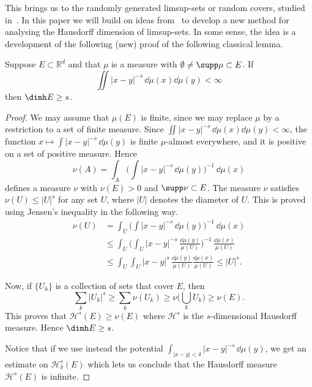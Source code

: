 This brings us to the randomly generated limsup-sets or random covers, studied in~\cite{fanwu,durand,jarvenpaaetal,persson,fengetal,seuret,ekstrompersson}. In this paper we will build on ideas from~\cite{persson} to develop a new method for analysing the Hausdorff dimension of limsup-sets. In some sense, the idea is a development of the following (new) proof of the following classical lemma.

\begin{lemm}\label{lem:classical}
Suppose $E \subset \mathbb{R}^d$ and that $\mu$ is a measure with $\emptyset \neq \supp \mu \subset E$. If
\[
\iint |x-y|^{-s} \, \dd\mu (x) \dd \mu (y) < \infty
\]
then $\dimh E \geq s$.
\end{lemm}

\begin{proof}
We may assume that $\mu (E)$ is finite, since we may replace $\mu$ by a restriction to a set of finite measure. Since $\iint |x-y|^{-s}
\, \dd\mu (x) \dd \mu (y) < \infty$, the function $x
\mapsto \int |x-y|^{-s} \, \dd \mu (y)$ is finite $\mu$-almost everywhere, and it is positive on a set of positive measure. Hence
\[
\nu (A) = \int_A \biggl(\int |x-y|^{-s} \, \dd \mu (y)
\biggr)^{-1} \, \dd \mu (x)
\]
defines a measure $\nu$ with $\nu (E) > 0$ and $\supp \nu \subset E$. The measure $\nu$ satisfies $\nu(U) \leq |U|^s$ for any set $U$, where $|U|$ denotes the diameter of $U$. This is proved using Jensen's inequality in the following way.
\begin{align*}
\nu (U) &= \int_U \biggl(\int |x-y|^{-s} \, \dd \mu (y)
\biggr)^{-1} \, \dd \mu (x) \\ &\leq \int_U \biggl(\int_U |x-y|^{-s} \, \frac{\dd \mu (y)}{\mu (U)} \biggr)^{-1} \,
\frac{\dd \mu (x)}{\mu (U)} \\ &\leq \int_U \int_U |x-y|^{s} \, \frac{\dd \mu (y)}{\mu (U)} \frac{\dd
\mu (x)}{\mu (U)} \leq |U|^s.
\end{align*}

Now, if $\{U_k\}$ is a collection of sets that cover $E$, then
\[
\sum_k |U_k|^s \geq \sum_k \nu (U_k) \geq \nu \biggl(\bigcup_k U_k
\biggr) \geq \nu (E).
\]
This proves that $\mathscr{H}^s (E) \geq \nu (E)$ where $\mathscr{H}^s$ is the $s$-dimensional Hausdorff measure. Hence $\dimh E \geq s$.

Notice that if we use instead the potential $\int_{|x-y|<\delta} |x-y|^{-s} \, \dd \mu (y)$, we get an estimate on $\mathscr{H}_\delta^s (E)$ which lets us conclude that the Hausdorff measure $\mathscr{H}^s (E)$ is infinite.
\end{proof}

